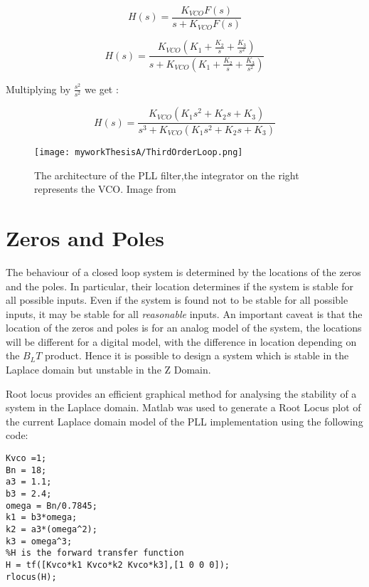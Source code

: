 \begin{equation}
 H(s) = \frac{K_{VCO}F(s)}{s+K_{VCO}F(s)}
\end{equation}

\begin{equation}
 H(s) = \frac{K_{VCO}(K_1 + \frac{K_2}{s} + \frac{K_3}{s^2})}{s+K_{VCO}(K_1 + \frac{K_2}{s} + \frac{K_3}{s^2})}
\end{equation}

Multiplying by $\frac{s^2}{s^2}$ we get :

\begin{equation}
 H(s) = \frac{K_{VCO}(K_1s^2 + K_2s + K_3)}{s^3+K_{VCO}(K_1s^2 + K_2s + K_3)}
 \end{equation}

\begin{figure}[!htb] 
    \centering
    \texttt{[image: myworkThesisA/ThirdOrderLoop.png]} 
    \caption{The architecture of the PLL filter,the integrator on the right represents the VCO. Image from \cite{Kaplan}}
    \label{fig:ThirdOrderLoop}
\end{figure}

\section{Zeros and Poles}
The behaviour of a closed loop system is determined by the locations of the zeros and the poles. In particular, their location determines if the system is stable for all possible inputs. Even if the system is found not to be stable for all possible inputs, it may be stable for all \emph{reasonable} inputs. An important caveat is that the location of the zeros and poles is for an analog model of the system, the locations will be different for a digital model, with the difference in location depending on the $B_LT$ product.  Hence it is possible to design a system which is stable in the Laplace domain but unstable in the Z Domain. 

Root locus provides an efficient graphical method for analysing the stability of a system in the Laplace domain\cite{Nise}. Matlab was used to generate a Root Locus plot of the current Laplace domain model of the \ac{PLL} implementation using the following code:

\begin{lstlisting}[frame=single]
Kvco =1;
Bn = 18;
a3 = 1.1;
b3 = 2.4;
omega = Bn/0.7845;
k1 = b3*omega;
k2 = a3*(omega^2);
k3 = omega^3;
%H is the forward transfer function
H = tf([Kvco*k1 Kvco*k2 Kvco*k3],[1 0 0 0]);
rlocus(H);
\end{lstlisting}

